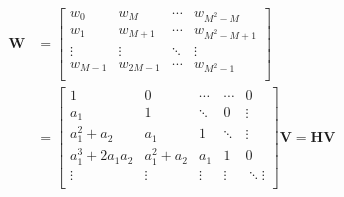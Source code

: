 \begin{equation}
    \label{eq:vector_ZIC_wo_trans}
    \begin{aligned}
        \bm{W} &= \left[\begin{array}{c|c|c|c}
            w_0 & w_M & \cdots & w_{M^2-M} \\ 
            w_1 & w_{M+1} & \cdots & w_{M^2-M+1} \\
            \vdots & \vdots & \ddots & \vdots \\
            w_{M-1} & w_{2M-1} &\cdots & w_{M^2-1} \\
            \end{array}\right]  \\
            &= \left[\begin{array}{ccccc}
                1 & 0 & \cdots & \cdots & 0 \\ 
                a_1 & 1 & \ddots & 0  & \vdots \\
                a_1^2+a_2 & a_1 & 1 & \ddots & \vdots \\
                a_1^3+2a_1a_2 & a_1^2+a_2 & a_1 & 1 & 0 \\
                \vdots & \vdots & \vdots & \vdots & \ddots\vdots \\
                \end{array}\right] \bm{V} = \bm{H}\bm{V} \\  
    \end{aligned}
\end{equation}
